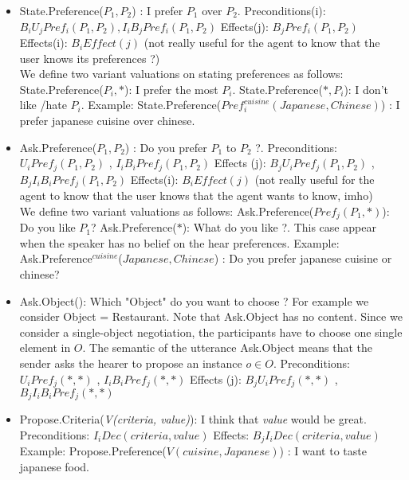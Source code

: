 \documentclass{llncs}
\begin{document}
 \begin{itemize}
 \item State.Preference(\textit{$P_{1}, P_{2}$}) : I prefer $P_{1}$ over $P_{2}$.
	 \subitem Preconditions(i):  $ B_{i} U_{j} Pref_{i}(P_{1}, P_{2}), I_{i} B_{j} Pref_{i}(P_{1}, P_{2})$
	 \subitem Effects(j): $ B_{j} Pref_{i}(P_{1}, P_{2})$
	 \subitem Effects(i): $ B_i Effect(j)$ (not really useful for the agent to know that the user knows its preferences ?)
	 \\ We define two variant valuations on stating preferences as follows: 
	 \subitem State.Preference(\textit{$P_{i}, *$}): I prefer the most $P_{i}$.
	 \subitem State.Preference(\textit{$*, P_{i}$}): I don't like /hate $P_{i}$.
	 \subitem Example: State.Preference(\textit{$Pref_{i}^{cuisine} (Japanese , Chinese)$}) : I prefer japanese cuisine over chinese.

 \item Ask.Preference(\textit{$P_{1}, P_{2}$}) : Do you prefer $P_{1}$ to $P_{2}$ ?. 
	  \subitem Preconditions:  $ U_{i} Pref_{j}(P_{1}, P_{2})$ ,  $ I_{i} B_{i} Pref_{j}(P_{1}, P_{2})$
	  \subitem Effects (j):  $B_{j} U_{i} Pref_{j}(P_{1}, P_{2})$ ,  $ B_{j} I_{i} B_{i}Pref_{j}(P_{1}, P_{2})$
	  \subitem Effects(i): $ B_i Effect(j)$ (not really useful for the agent to know that the user knows that the agent wants to know, imho)
	 \\We define two variant valuations as follows: 
	 \subitem Ask.Preference(\textit{$Pref_{j}(P_{1}, *)$}): Do you like $P_{1}$?
	 \subitem Ask.Preference(\textit{$*$}): What do you like ?. This case appear when the speaker has no belief on the hear preferences. 
	 \subitem Example: Ask.Preference$^{cuisine}$(\textit{$Japanese , Chinese$}) : Do you prefer japanese cuisine or chinese?

 \item Ask.Object(): Which "Object" do you want to choose ? For example we consider Object = Restaurant. Note that Ask.Object has no content. Since we consider a single-object negotiation, the participants have to choose one single element in $O$. The semantic of the utterance Ask.Object means that the sender asks the hearer to propose an instance $o\in O$.
	\subitem Preconditions:  $ U_{i} Pref_{j}(*,*)$ ,  $ I_{i} B_{i} Pref_{j}(*,*)$
  	\subitem Effects (j):  $B_{j} U_{i} Pref_{j}(*, *)$ ,  $ B_{j} I_{i} B_{i}Pref_{j}(*,*)$
 
 \item Propose.Criteria(\textit{V(criteria, value)}): I think that \textit{value}  would be great. 
	  \subitem Preconditions:  $ I_{i} Dec(criteria, value) $
	  \subitem Effects:  $B_{j} I_{i} Dec(criteria, value)$
	  \subitem Example: Propose.Preference(\textit{$V(cuisine,Japanese)$}) : I want to taste japanese food.


\end{itemize}
\end{document}
